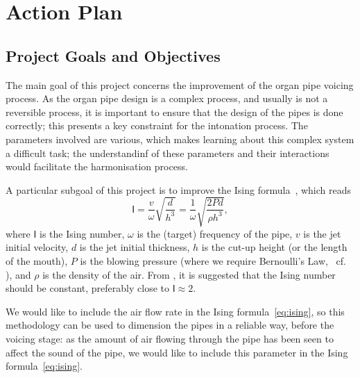\documentclass{psu-plan}
\begin{document}
\section{Action Plan}


\subsection{Project Goals and Objectives}

The main goal of this project concerns the improvement of the organ pipe voicing
process.
As the organ pipe design is a complex process, and usually is not a reversible
process, it is important to ensure that the design of the pipes is done
correctly; this presents a key constraint for the intonation process.
The parameters involved are various, which makes learning about this complex
system a difficult task; the understandinf of these parameters and their
interactions would facilitate the harmonisation process.

A particular subgoal of this project is to improve the Ising
formula~\autocite{1971Ising-1}, which reads
\begin{equation}
    \label{eq:ising}
    \mathsf{I}
    =
    \frac{v}{\omega}\sqrt{\frac{d}{h^3}}
    =
    \frac{1}{\omega}\sqrt{\frac{2 P d}{\rho h^3}},
\end{equation}
where \(\mathsf{I}\) is the Ising number, \(\omega\) is the (target) frequency
of the pipe, \(v\) is the jet initial velocity, \(d\) is the jet initial
thickness, \(h\) is the cut-up height (or the length of the mouth), \(P\) is the
blowing pressure (where we require Bernoulli's Law, ~cf. \autocite{2025Lilj-1}),
and \(\rho\) is the density of the air.
From \autocite{1971Ising-1, 2025Lilj-1}, it is suggested that the Ising number
should be constant, preferably close to \( \mathsf{I} \approx 2\).

We would like to include the air flow rate in the Ising formula~\ref{eq:ising},
so this methodology can be used to dimension the pipes in a reliable way,
before the voicing stage: as the amount of air flowing through the pipe has been
seen to affect the sound of the pipe, we would like to include this parameter in
the Ising formula~\ref{eq:ising}.
\end{document}
